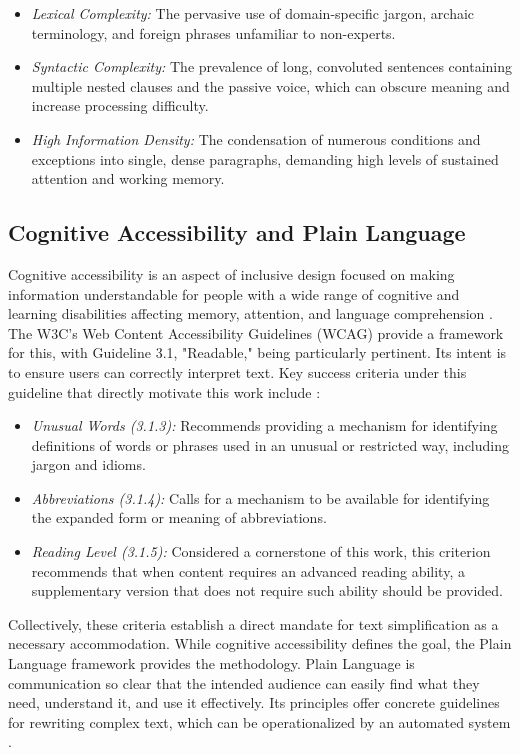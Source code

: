 \documentclass[english]{UNISINOSartigo} %
\begin{document}
\begin{itemize}
 \item \textit{Lexical Complexity:} The pervasive use of domain-specific jargon, archaic terminology, and foreign phrases unfamiliar to non-experts.
 \item \textit{Syntactic Complexity:} The prevalence of long, convoluted sentences containing multiple nested clauses and the passive voice, which can obscure meaning and increase processing difficulty.
 \item \textit{High Information Density:} The condensation of numerous conditions and exceptions into single, dense paragraphs, demanding high levels of sustained attention and working memory.
\end{itemize}

\subsection{Cognitive Accessibility and Plain Language}

Cognitive accessibility is an aspect of inclusive design focused on making information understandable for people with a wide range of cognitive and learning disabilities affecting memory, attention, and language comprehension \cite{w3c2023wcag}. The W3C's Web Content Accessibility Guidelines (WCAG) provide a framework for this, with Guideline 3.1, "Readable," being particularly pertinent. Its intent is to ensure users can correctly interpret text. Key success criteria under this guideline that directly motivate this work include \cite{w3c2023wcag}:

\begin{itemize}
    \item \textit{Unusual Words (3.1.3):} Recommends providing a mechanism for identifying definitions of words or phrases used in an unusual or restricted way, including jargon and idioms.
    \item \textit{Abbreviations (3.1.4):} Calls for a mechanism to be available for identifying the expanded form or meaning of abbreviations.
    \item \textit{Reading Level (3.1.5):} Considered a cornerstone of this work, this criterion recommends that when content requires an advanced reading ability, a supplementary version that does not require such ability should be provided.
\end{itemize}

Collectively, these criteria establish a direct mandate for text simplification as a necessary accommodation. While cognitive accessibility defines the goal, the Plain Language framework provides the methodology. Plain Language is communication so clear that the intended audience can easily find what they need, understand it, and use it effectively. Its principles offer concrete guidelines for rewriting complex text, which can be operationalized by an automated system \cite{iso2023plain}.
\end{document}

